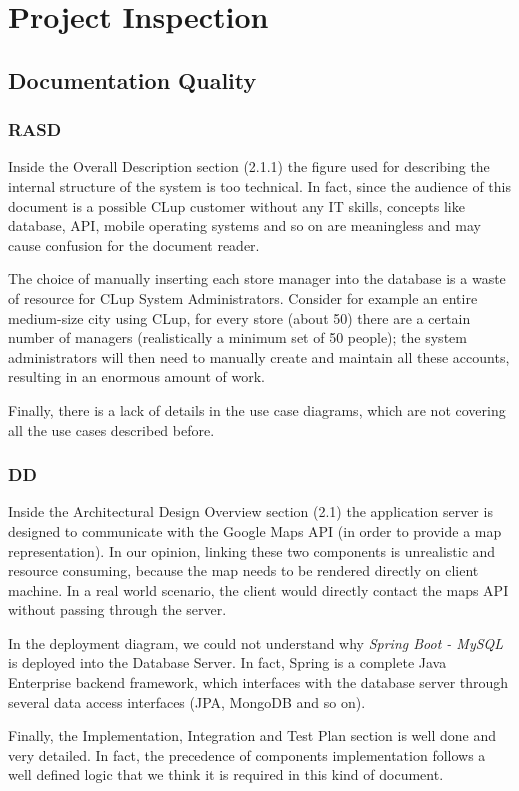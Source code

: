 \documentclass[table, 12pt]{article}
\begin{document}
\section{Project Inspection}
\subsection{Documentation Quality}
\subsubsection{RASD}
Inside the Overall Description section (2.1.1) the figure used for describing the internal structure of the system is too technical.
In fact, since the audience of this document is a possible CLup customer without any IT skills, concepts like database, API, mobile operating systems and so on are meaningless and may cause confusion for the document reader.

The choice of manually inserting each store manager into the database is a waste of resource for CLup System Administrators. Consider for example an entire medium-size city using CLup, for every store (about 50) there are a certain number of managers (realistically a minimum set of 50 people); the system administrators will then need to manually create and maintain all these accounts, resulting in an enormous amount of work.

Finally, there is a lack of details in the use case diagrams, which are not covering all the use cases described before.
\subsubsection{DD}
Inside the Architectural Design Overview section (2.1) the application server is designed to communicate with the Google Maps API (in order to provide a map representation).
In our opinion, linking these two components is unrealistic and resource consuming, because the map needs to be rendered directly on client machine. In a real world scenario, the client would directly contact the maps API without passing through the server.

In the deployment diagram, we could not understand why \textit{Spring Boot - MySQL} is deployed into the Database Server. In fact, Spring is a complete Java Enterprise backend framework, which interfaces with the database server through several data access interfaces (JPA, MongoDB and so on).

Finally, the Implementation, Integration and Test Plan section is well done and very detailed. In fact, the precedence of components implementation follows a well defined logic that we think it is required in this kind of document.
\end{document}
